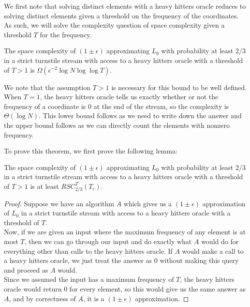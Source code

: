 \documentclass{toc}
\begin{document}
We first note that solving distinct elements with a heavy hitters oracle reduces to solving distinct elements given a threshold on the frequency of the coordinates. As such, we will solve the complexity question of space complexity given a threshold $T$ for the frequency.

\begin{theorem}
\label{thm:streaming_bound}
The space complexity of $(1\pm \epsilon)$ approximating $L_0$ with probability at least $2/3$ in a strict turnstile stream with access to a heavy hitters oracle with a threshold of $T > 1$ is $\Omega(\epsilon^{-2} \log N \log \log T)$.
\end{theorem}

We note that the assumption $T > 1$ is necessary for this bound to be well defined. When $T=1$, the heavy hitters oracle tells us exactly whether or not the frequency of a coordinate is $0$ at the end of the stream, so the complexity is $\Theta(\log N)$. This lower bound follows as we need to write down the answer and the upper bound follows as we can directly count the elements with nonzero frequency.

To prove this theorem, we first prove the following lemma:

\begin{lemma}
\label{thm:promise_reduction}
The space complexity of $(1\pm \epsilon)$ approximating $L_0$ with probability at least $2/3$ in a strict turnstile stream with access to a heavy hitters oracle with a threshold of $T > 1$ is at least $RSC^T_{2/3}(T_\epsilon)$.
\end{lemma}
\begin{proof}
Suppose we have an algorithm $A$ which gives us a $(1\pm \epsilon)$ approximation of $L_0$ in a strict turnstile stream with access to a heavy hitters oracle with a threshold of $T$.\\

Now, if we are given an input where the maximum frequency of any element is at most $T$, then we can go through our input and do exactly what $A$ would do for everything other than calls to the heavy hitters oracle. If $A$ would make a call to a heavy hitters oracle, we just treat the answer as $0$ without making this query and proceed as $A$ would.\\

Since we assumed the input has a maximum frequency of $T$, the heavy hitters
oracle would return $0$ for every element, so this would give 
us the same answer as $A$, and by correctness of $A$, it is a $(1\pm \epsilon)$
approximation. %
\end{proof}
\end{document}
